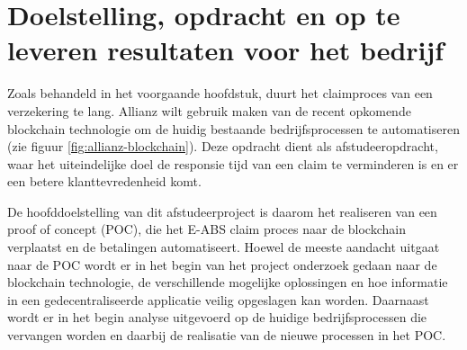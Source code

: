 \chapter{Doelstelling, opdracht en op te leveren resultaten voor het bedrijf}
Zoals behandeld in het voorgaande hoofdstuk, duurt het claimproces van een verzekering te lang. Allianz wilt gebruik maken van de recent opkomende blockchain technologie om de huidig bestaande bedrijfsprocessen te automatiseren (zie figuur \ref{fig:allianz-blockchain}). Deze opdracht dient als afstudeeropdracht, waar het uiteindelijke doel de responsie tijd van een claim te verminderen is en er een betere klanttevredenheid komt.\par

De hoofddoelstelling van dit afstudeerproject is daarom het realiseren van een proof of concept (POC), die het E-ABS claim proces naar de blockchain verplaatst en de betalingen automatiseert. Hoewel de meeste aandacht uitgaat naar de POC wordt er in het begin van het project onderzoek gedaan naar de blockchain technologie, de verschillende mogelijke oplossingen en hoe informatie in een gedecentraliseerde applicatie veilig opgeslagen kan worden. Daarnaast wordt er in het begin analyse uitgevoerd op de huidige bedrijfsprocessen die vervangen worden en daarbij de realisatie van de nieuwe processen in het POC.

